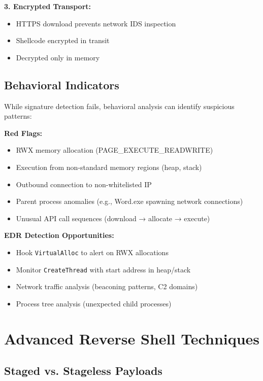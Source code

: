\documentclass[11pt,conference]{IEEEtran}
\begin{document}
\textbf{3. Encrypted Transport:}
\begin{itemize}
    \item HTTPS download prevents network IDS inspection
    \item Shellcode encrypted in transit
    \item Decrypted only in memory
\end{itemize}

\subsection{Behavioral Indicators}

While signature detection fails, behavioral analysis can identify suspicious patterns:

\textbf{Red Flags:}
\begin{itemize}
    \item RWX memory allocation (PAGE\_EXECUTE\_READWRITE)
    \item Execution from non-standard memory regions (heap, stack)
    \item Outbound connection to non-whitelisted IP
    \item Parent process anomalies (e.g., Word.exe spawning network connections)
    \item Unusual API call sequences (download → allocate → execute)
\end{itemize}

\textbf{EDR Detection Opportunities:}
\begin{itemize}
    \item Hook \texttt{VirtualAlloc} to alert on RWX allocations
    \item Monitor \texttt{CreateThread} with start address in heap/stack
    \item Network traffic analysis (beaconing patterns, C2 domains)
    \item Process tree analysis (unexpected child processes)
\end{itemize}

\section{Advanced Reverse Shell Techniques}

\subsection{Staged vs. Stageless Payloads}
\end{document}
